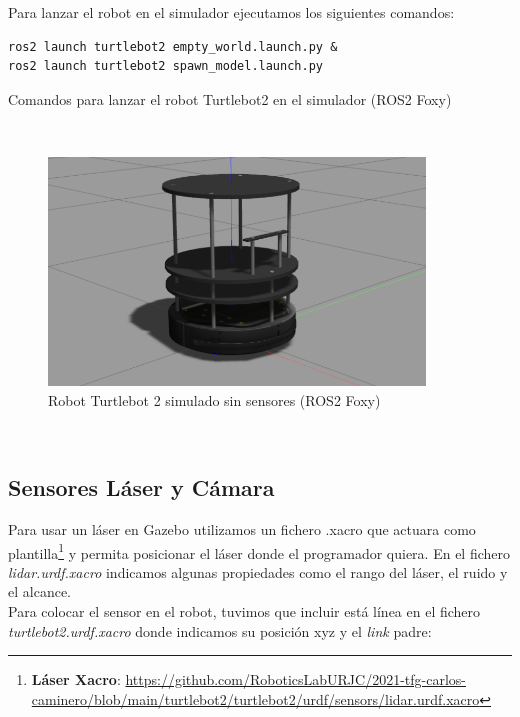 Para lanzar el robot en el simulador ejecutamos los siguientes comandos:\\
\begin{code}[H]
\begin{lstlisting}
ros2 launch turtlebot2 empty_world.launch.py &
ros2 launch turtlebot2 spawn_model.launch.py
\end{lstlisting}
\caption{Comandos para lanzar el robot Turtlebot2 en el simulador (ROS2 Foxy)}
\label{codd:comandos_turtlebot2_simulador}
\end{code}\

\begin{figure} [H]
  \begin{center}
    \includegraphics[width=10cm]{imagenes/cap4/cuerpo_turtlebot2.png}
  \end{center}
  \caption[Robot Turtlebot 2 simulado sin sensores (ROS2 Foxy)]{Robot Turtlebot 2 simulado sin sensores (ROS2 Foxy)}
  \label{fig:turtlebot2_sin_sensores_simulado}
\end{figure}\



\subsection{Sensores Láser y Cámara}
\label{subsec:sensores_camara}

Para usar un láser en Gazebo utilizamos un fichero .xacro que actuara como plantilla\footnote{\textbf{Láser Xacro}: \url{https://github.com/RoboticsLabURJC/2021-tfg-carlos-caminero/blob/main/turtlebot2/turtlebot2/urdf/sensors/lidar.urdf.xacro}} y permita posicionar el láser donde el programador quiera. En el fichero \textit{lidar.urdf.xacro} indicamos algunas propiedades como el rango del láser, el ruido y el alcance.\\

Para colocar el sensor en el robot, tuvimos que incluir está línea en el fichero \textit{turtlebot2.urdf.xacro} donde indicamos su posición xyz y el \textit{link} padre:\\

